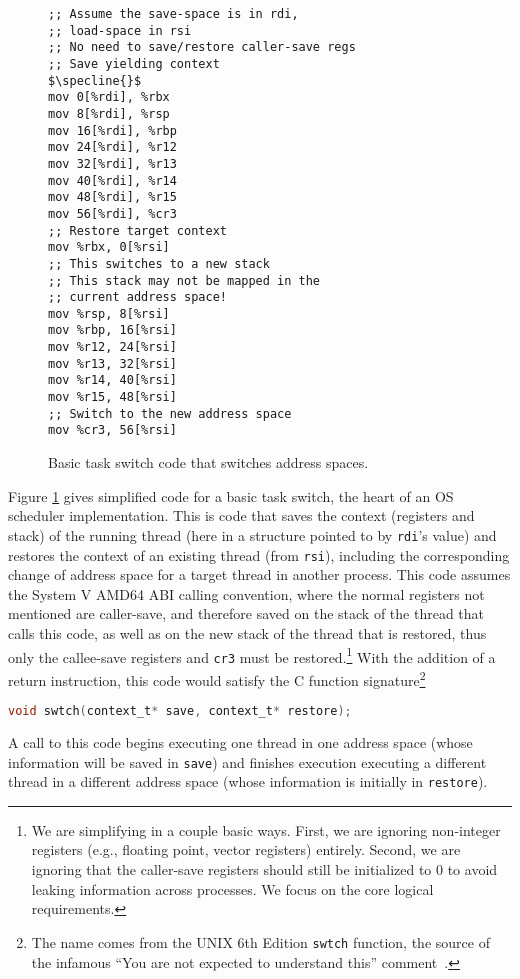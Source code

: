 
\begin{figure}
\begin{lstlisting}
;; Assume the save-space is in rdi,
;; load-space in rsi
;; No need to save/restore caller-save regs
;; Save yielding context
$\specline{}$  
mov 0[%rdi], %rbx
mov 8[%rdi], %rsp
mov 16[%rdi], %rbp
mov 24[%rdi], %r12
mov 32[%rdi], %r13
mov 40[%rdi], %r14
mov 48[%rdi], %r15
mov 56[%rdi], %cr3
;; Restore target context
mov %rbx, 0[%rsi] 
;; This switches to a new stack
;; This stack may not be mapped in the
;; current address space!
mov %rsp, 8[%rsi] 
mov %rbp, 16[%rsi]
mov %r12, 24[%rsi]
mov %r13, 32[%rsi]
mov %r14, 40[%rsi]
mov %r15, 48[%rsi]
;; Switch to the new address space
mov %cr3, 56[%rsi]
\end{lstlisting}
\caption{Basic task switch code that switches address spaces.}
\label{fig:swtch}
\end{figure}

Figure \ref{fig:swtch} gives simplified code for a basic task switch, the heart of an OS scheduler implementation. This is code that saves the context (registers and stack) of the running thread (here in a structure pointed to by \lstinline|rdi|'s value) and restores the context of an existing thread (from \lstinline|rsi|), including the corresponding change of address space for a target thread in another process.
This code assumes the System V AMD64 ABI calling convention, where the normal registers not mentioned are caller-save, and therefore saved on the stack of the thread that calls this code, as well as on the new stack of the thread that is restored, thus only the callee-save registers and \texttt{cr3} must be restored.\footnote{We are simplifying in a couple basic ways. First, we are ignoring non-integer registers (e.g., floating point, vector registers) entirely. Second, we are ignoring that the caller-save registers should still be initialized to 0 to avoid leaking information across processes. We focus on the core logical requirements.}
With the addition of a return instruction, this code would satisfy the C function signature\footnote{The name comes from the UNIX 6th Edition \lstinline|swtch| function, the source of the infamous ``You are not expected to understand this'' comment~\cite{lions1996lions}.}
\begin{lstlisting}[language=C]
void swtch(context_t* save, context_t* restore);
\end{lstlisting}
A call to this code begins executing one thread in one address space (whose information will be saved in \lstinline[language=C]|save|) and finishes execution executing a different thread in a different address space (whose information is initially in \lstinline[language=C]|restore|).

